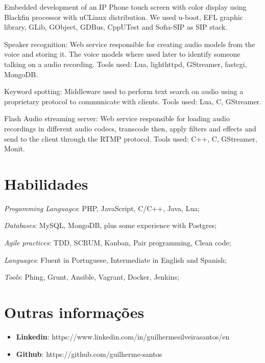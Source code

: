\documentclass[margin]{res}
\begin{document}
\begin{resume}
Embedded development of an IP Phone touch screen with color display 
using Blackfin processor with uCLinux distribution. We used u-boot, EFL 
graphic library, GLib, GObject, GDBus, CppUTest and Sofia-SIP as SIP stack.

Speaker recognition: Web service responsible for creating audio models from the voice and storing it. The voice models where used later to identify someone talking on a audio recording. Tools used: Lua, lighthttpd, GStreamer, fastcgi, MongoDB.

Keyword spotting: Middleware used to perform text search on audio using a proprietary protocol to communicate with clients. Tools used: Lua, C, GStreamer.

Flash Audio streaming server: Web service responsible for loading audio recordings in different audio codecs, transcode then, apply filters and effects and send to the client through the RTMP protocol. Tools used: C++, C, GStreamer, Monit.

\section{Habilidades} \textit{Progamming Languages}: PHP, JavaScript, C/C++, Java, Lua;

	\textit{Databases}: MySQL, MongoDB, plus some experience with Postgres;

	\textit{Agile practices}: TDD, SCRUM, Kanban, Pair programming, Clean code;

	\textit{Languages}: Fluent in Portuguese, Intermediate in English and Spanish;

	\textit{Tools}: Phing, Grunt, Ansible, Vagrant, Docker, Jenkins;
 
\section{Outras informações}
    \begin{itemize}
        \item \textbf{Linkedin}: https://www.linkedin.com/in/guilhermesilveirasantos/en
         \item \textbf{Github}: https://github.com/guilherme-santos
    \end{itemize}


\end{resume} 
\end{document}
